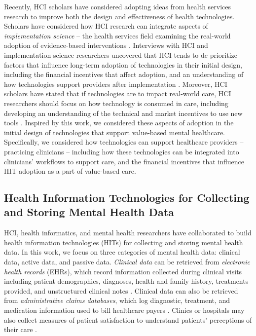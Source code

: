Recently, HCI scholars have considered adopting ideas from health services research to improve both the design and effectiveness of health technologies.
Scholars have considered how HCI research can integrate aspects of \textit{implementation science} -- the health services field examining the real-world adoption of evidence-based interventions \cite{lyon_bridging_2023}. 
Interviews with HCI and implementation science researchers uncovered that HCI tends to de-prioritize factors that influence long-term adoption of technologies in their initial design, including the financial incentives that affect adoption, and an understanding of how technologies support providers after implementation \cite{dopp_aligning_2020}.
Moreover, HCI scholars have stated that if technologies are to impact real-world care, HCI researchers should focus on how technology is consumed in care, including developing an understanding of the technical and market incentives to use new tools \cite{colusso_translational_2019}.
Inspired by this work, we considered these aspects of adoption in the initial design of technologies that support value-based mental healthcare.
Specifically, we considered how technologies can support healthcare providers -- practicing clinicians -- including how these technologies can be integrated into clinicians' workflows to support care, and the financial incentives that influence HIT adoption as a part of value-based care.

\subsection{Health Information Technologies for Collecting and Storing Mental Health Data}
\label{sec:rw:data}

HCI, health informatics, and mental health researchers have collaborated to build health information technologies (HITs) for collecting and storing mental health data.
In this work, we focus on three categories of mental health data: clinical data, active data, and passive data.
\textit{Clinical data} can be retrieved from \textit{electronic health records} (EHRs), which record information collected during clinical visits including patient demographics, diagnoses, health and family history, treatments provided, and unstructured clinical notes \cite{birkhead_uses_2015}.
Clinical data can also be retrieved from \textit{administrative claims databases}, which log diagnostic, treatment, and medication information used to bill healthcare payers \cite{karve_prospective_2009, davis_can_2016}.
Clinics or hospitals may also collect measures of patient satisfaction to understand patients' perceptions of their care \cite{carr-hill_measurement_1992}.

